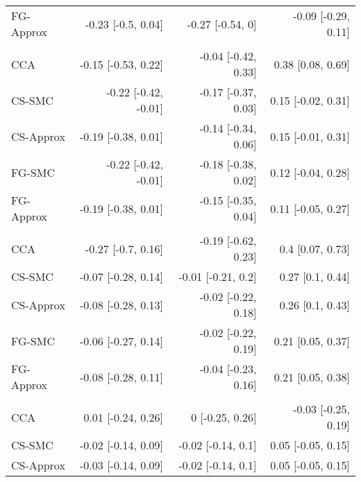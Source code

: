 \documentclass[
  12pt,
  a4paper,
]{article}
\begin{document}
\begin{longtable}[t]{lrrr}
\hspace{1em}FG-Approx & -0.23 [-0.5, 0.04] & -0.27 [-0.54, 0] & -0.09 [-0.29, 0.11]\\
\addlinespace[0.3em]
\multicolumn{4}{l}{\textbf{HCT-CI ($1-2$)}}\\
\hspace{1em}CCA & -0.15 [-0.53, 0.22] & -0.04 [-0.42, 0.33] & 0.38 [0.08, 0.69]\\
\hspace{1em}CS-SMC & -0.22 [-0.42, -0.01] & -0.17 [-0.37, 0.03] & 0.15 [-0.02, 0.31]\\
\hspace{1em}CS-Approx & -0.19 [-0.38, 0.01] & -0.14 [-0.34, 0.06] & 0.15 [-0.01, 0.31]\\
\hspace{1em}FG-SMC & -0.22 [-0.42, -0.01] & -0.18 [-0.38, 0.02] & 0.12 [-0.04, 0.28]\\
\hspace{1em}FG-Approx & -0.19 [-0.38, 0.01] & -0.15 [-0.35, 0.04] & 0.11 [-0.05, 0.27]\\
\addlinespace[0.3em]
\multicolumn{4}{l}{\textbf{HCT-CI ($\geq 3$)}}\\
\hspace{1em}CCA & -0.27 [-0.7, 0.16] & -0.19 [-0.62, 0.23] & 0.4 [0.07, 0.73]\\
\hspace{1em}CS-SMC & -0.07 [-0.28, 0.14] & -0.01 [-0.21, 0.2] & 0.27 [0.1, 0.44]\\
\hspace{1em}CS-Approx & -0.08 [-0.28, 0.13] & -0.02 [-0.22, 0.18] & 0.26 [0.1, 0.43]\\
\hspace{1em}FG-SMC & -0.06 [-0.27, 0.14] & -0.02 [-0.22, 0.19] & 0.21 [0.05, 0.37]\\
\hspace{1em}FG-Approx & -0.08 [-0.28, 0.11] & -0.04 [-0.23, 0.16] & 0.21 [0.05, 0.38]\\
\addlinespace[0.3em]
\multicolumn{4}{l}{\textbf{Interval diagnosis to alloHCT (decades)}}\\
\hspace{1em}CCA & 0.01 [-0.24, 0.26] & 0 [-0.25, 0.26] & -0.03 [-0.25, 0.19]\\
\hspace{1em}CS-SMC & -0.02 [-0.14, 0.09] & -0.02 [-0.14, 0.1] & 0.05 [-0.05, 0.15]\\
\hspace{1em}CS-Approx & -0.03 [-0.14, 0.09] & -0.02 [-0.14, 0.1] & 0.05 [-0.05, 0.15]\\

\end{longtable}
\end{document}
